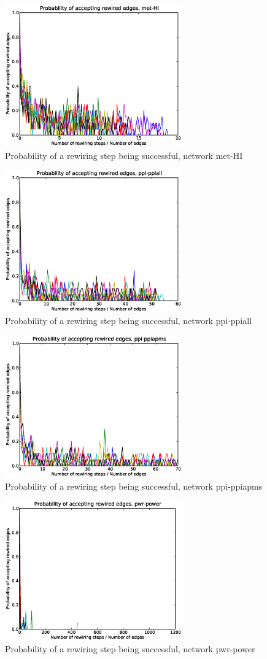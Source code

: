 \begin{figure}[p]
\centering
\includegraphics[width=3in]{Figures/Paccept-met-HI.eps}
\caption{Probability of a rewiring step being successful, network met-HI}
\label{fig:Paccept-met-HI}
\end{figure}

\begin{figure}[p]
\centering
\includegraphics[width=3in]{Figures/Paccept-ppi-ppiall.eps}
\caption{Probability of a rewiring step being successful, network ppi-ppiall}
\label{fig:Paccept-ppi-ppiall}
\end{figure}

\begin{figure}[p]
\centering
\includegraphics[width=3in]{Figures/Paccept-ppi-ppiapms.eps}
\caption{Probability of a rewiring step being successful, network ppi-ppiapms}
\label{fig:Paccept-ppi-ppiapms}
\end{figure}

\begin{figure}[p]
\centering
\includegraphics[width=3in]{Figures/Paccept-pwr-power.eps}
\caption{Probability of a rewiring step being successful, network pwr-power}
\label{fig:Paccept-pwr-power}
\end{figure}
